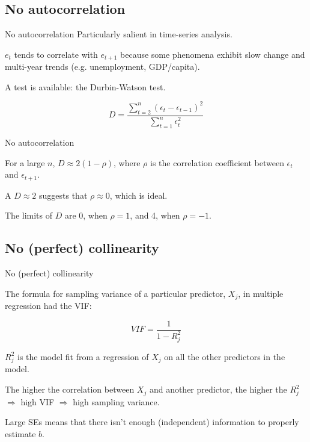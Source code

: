 \documentclass[12pt,english,pdf,xcolor=dvipsnames,aspectratio=169,handout]{beamer}\usepackage[]{graphicx}\usepackage[]{xcolor}
\begin{document}
\subsection{No autocorrelation}

\begin{frame}{No autocorrelation}
Particularly salient in time-series analysis.\bigskip

$e_t$ tends to correlate with $e_{t+1}$ because some phenomena exhibit slow change and multi-year trends (e.g. unemployment, GDP/capita).\bigskip

A test is available: the Durbin-Watson test.\bigskip

\begin{equation}
  D = \frac{\sum_{t=2}^n(\epsilon_t - \epsilon_{t-1})^2}{\sum_{t=1}^n\epsilon_t^2}
\end{equation}
\end{frame}


\begin{frame}{No autocorrelation}

For a large $n$, $D \approx 2(1-\rho)$, where $\rho$ is the correlation coefficient between $\epsilon_t$ and $\epsilon_{t+1}$.\bigskip

A $D \approx 2$ suggests that $\rho \approx 0$, which is ideal.\bigskip

The limits of $D$ are 0, when $\rho=1$, and 4, when $\rho=-1$.

\end{frame}



\subsection{No (perfect) collinearity}

\begin{frame}{No (perfect) collinearity}

The formula for sampling variance of a particular predictor, $X_j$, in multiple regression had the VIF:

\begin{equation}
VIF = \frac{1}{1 - R_j^2}
\end{equation}

$R_j^2$ is the model fit from a regression of $X_j$ on all the other predictors in the model.\bigskip

The higher the correlation between $X_j$ and another predictor, the higher the $R_j^2$ $\Rightarrow$ high VIF $\Rightarrow$ high sampling variance.

Large SEs means that there isn't enough (independent) information to properly estimate $b$.
\end{frame}
\end{document}
